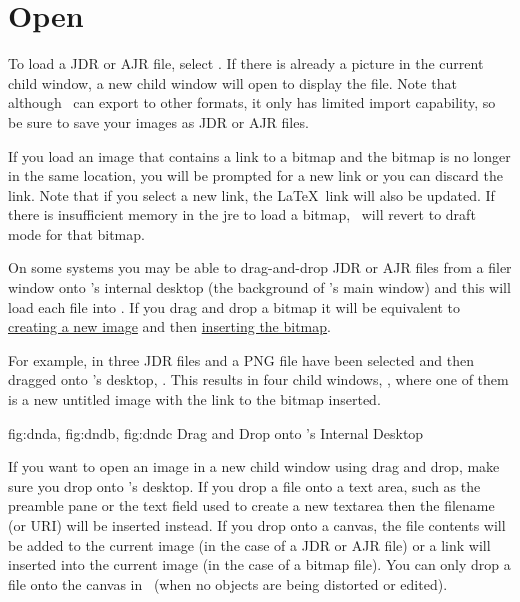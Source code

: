 \section{Open}\label{sec:loadimage}


To load a \gls{JDR} or \gls{AJR} file, select .
If there is already a picture in the current child window, a new
child window will open to display the file. Note that although
\FlowframTk\ can export to other formats, it only has limited
import capability, so be sure to save your images as 
\gls{JDR} or \gls{AJR} files.

If you load an image that contains a link to a \gls{bitmap} and
the bitmap is no longer in the same location, you will be prompted
for a new link or you can discard the link. Note that if you
select a new link, the \LaTeX\ link will also be updated.
If there is insufficient memory in the \gls{jre} to load a bitmap,
\FlowframTk\ will revert to draft mode for that bitmap.

On some systems you may be able to \gls{drag-and-drop} \gls*{JDR} or
\gls*{AJR} files from a filer window onto \FlowframTk's internal desktop
(the  background of \FlowframTk's main window) and this
will load each file into \FlowframTk. If you drag and drop a
\gls{bitmap} it will be equivalent to \hyperref[sec:newimage]{creating a
new image} and then \hyperref[sec:insertbitmap]{inserting the bitmap}.

For example, in  three \gls{JDR} files and
a PNG file have been selected and then dragged onto \FlowframTk's
desktop, . This results in four child
windows, , where one of them is a new
untitled image with the link to the \gls{bitmap} inserted.

{
  {fig:dnda}{}{},
  {fig:dndb}{}{},
  {fig:dndc}{}{}
}
{Drag and Drop onto \FlowframTk's Internal Desktop}

If you want to open an image in a new child window using drag and drop,
make sure you drop onto \FlowframTk's desktop. If you drop a file onto a
text area, such as the preamble pane or the text field used to
create a new \gls{textarea} then the filename (or URI) will be
inserted instead. If you drop onto a \gls{canvas}, the file contents
will be added to the current image (in the case of a \gls{JDR} or
\gls{AJR} file) or a link will inserted into the current image (in the
case of a \gls{bitmap} file). You can only drop a file onto the
\gls{canvas} in \selectmode\ (when no objects are being distorted or
edited).

